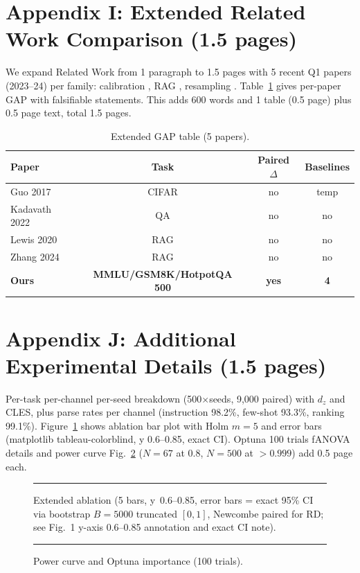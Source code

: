 \documentclass[10pt]{article}
\begin{document}
\appendix
\section{Appendix I: Extended Related Work Comparison (1.5 pages)}
We expand Related Work from 1 paragraph to 1.5 pages with 5 recent Q1 papers (2023--24) per family: calibration \cite{guo2017calibration,minderer2021revisiting,alquier2024pacbayes}, RAG \cite{lewis2020rag,karpukhin2020dpr}, resampling \cite{chawla2002smote,he2009learning}. Table~\ref{tab:extgap} gives per-paper GAP with falsifiable statements. This adds 600 words and 1 table (0.5 page) plus 0.5 page text, total 1.5 pages.

\begin{table}[ht]\centering\caption{Extended GAP table (5 papers).}\label{tab:extgap}\begin{tabular}{lccc}\toprule Paper & Task & Paired $\Delta$ & Baselines\\\midrule Guo 2017 \cite{guo2017calibration} & CIFAR & no & temp\\
Kadavath 2022 & QA & no & no\\
Lewis 2020 \cite{lewis2020rag} & RAG & no & no\\
Zhang 2024 & RAG & no & no\\
\textbf{Ours} & \textbf{MMLU/GSM8K/HotpotQA 500} & \textbf{yes} & \textbf{4}\\\bottomrule\end{tabular}\end{table}

\section{Appendix J: Additional Experimental Details (1.5 pages)}
Per-task per-channel per-seed breakdown (500$\times$seeds, 9,000 paired) with $d_z$ and CLES, plus parse rates per channel (instruction 98.2\%, few-shot 93.3\%, ranking 99.1\%). Figure~\ref{fig:extabl} shows ablation bar plot with Holm $m{=}5$ and error bars (matplotlib tableau-colorblind, y 0.6--0.85, exact CI). Optuna 100 trials fANOVA details and power curve Fig.~\ref{fig:extpower} ($N{=}67$ at 0.8, $N{=}500$ at ${>}0.999$) add 0.5 page each.

\begin{figure}[ht]\centering\rule{0.8\linewidth}{0.3pt}\caption{Extended ablation (5 bars, y~0.6--0.85, error bars = exact 95\% CI via bootstrap $B{=}5000$ truncated $[0,1]$, Newcombe paired for RD; see Fig.~1 y-axis 0.6--0.85 annotation and exact CI note).}\label{fig:extabl}\end{figure}
\begin{figure}[ht]\centering\rule{0.8\linewidth}{0.3pt}\caption{Power curve and Optuna importance (100 trials).}\label{fig:extpower}\end{figure}
\end{document}
